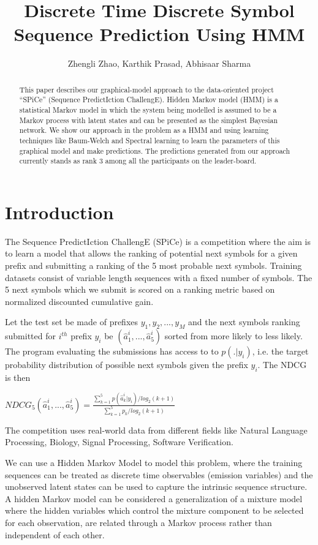 \documentclass[letterpaper]{article}
\title{Discrete Time Discrete Symbol Sequence Prediction Using HMM}
\author{Zhengli Zhao, Karthik Prasad, Abhisaar Sharma}
\begin{document}
\maketitle

\begin{abstract}
	This paper describes our graphical-model approach to the data-oriented project “SPiCe” (Sequence PredictIction ChallengE). Hidden Markov model (HMM) is a statistical Markov model in which the system being modelled is assumed to be a Markov process with latent states and can be presented as the simplest Bayesian network. We show our approach in  the problem as a HMM and using learning techniques like Baum-Welch and Spectral learning to learn the parameters of this graphical model and make predictions. The predictions generated from our approach currently stands as rank 3 among all the participants on the leader-board.
\end{abstract}

\section{Introduction}
The Sequence PredictIction ChallengE (SPiCe) is a competition where the aim is to learn a model that allows the ranking of potential next symbols for a given prefix and submitting a ranking of the 5 most probable next symbols. Training datasets consist of variable length sequences with a fixed number of symbols. The 5 next symbols which we submit is scored on a ranking metric based on normalized discounted cumulative gain.

Let the test set be made of prefixes $y_{1},y_{2},..., y_{M}$ and the next symbols ranking submitted for $i^{th}$ prefix $y_{i}$ be $(\hat{a}^{i}_{1},...,\hat{a}^{i}_{5})$ sorted from more likely to less likely. The program evaluating the submissions has access to to $p(.|y_{i})$, i.e. the target probability distribution of possible next symbols given the prefix $y_{i}$. The NDCG is then
\begin{center}
	$\displaystyle NDCG_{5}(\hat{a}^{i}_{1},...,\hat{a}^{i}_{5}) = \frac{\sum_{k=1}^{5}p(\hat{a}_{k}^{i}| y_{i}) / log_{2}(k+1)}{\sum_{k=1}^{5}p_{k} / log_{2}(k+1)} $  
\end{center}

The competition uses real-world data from different fields like Natural Language Processing, Biology, Signal Processing, Software Verification. 

We can use a Hidden Markov Model to model this problem, where the training sequences can be treated as discrete time observables (emission variables) and the unobserved latent states can be used to capture the intrinsic sequence structure. A hidden Markov model can be considered a generalization of a mixture model where the hidden variables which control the mixture component to be selected for each observation, are related through a Markov process rather than independent of each other. 
\end{document}
